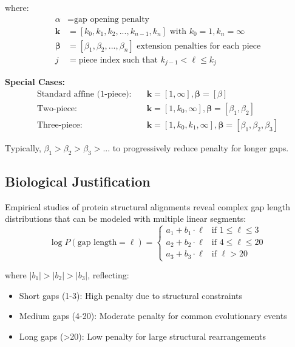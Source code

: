 \documentclass[11pt]{article}
\begin{document}
where:
\begin{align}
\alpha &= \text{gap opening penalty} \\
\mathbf{k} &= [k_0, k_1, k_2, ..., k_{n-1}, k_n] \text{ with } k_0 = 1, k_n = \infty \\
\boldsymbol{\beta} &= [\beta_1, \beta_2, ..., \beta_n] \text{ extension penalties for each piece} \\
j &= \text{piece index such that } k_{j-1} < \ell \leq k_j
\end{align}

\textbf{Special Cases:}
\begin{align}
\text{Standard affine (1-piece):} \quad &\mathbf{k} = [1, \infty], \boldsymbol{\beta} = [\beta] \\
\text{Two-piece:} \quad &\mathbf{k} = [1, k_0, \infty], \boldsymbol{\beta} = [\beta_1, \beta_2] \\
\text{Three-piece:} \quad &\mathbf{k} = [1, k_0, k_1, \infty], \boldsymbol{\beta} = [\beta_1, \beta_2, \beta_3]
\end{align}

Typically, $\beta_1 > \beta_2 > \beta_3 > ...$ to progressively reduce penalty for longer gaps.

\subsection{Biological Justification}

Empirical studies of protein structural alignments reveal complex gap length distributions that can be modeled with multiple linear segments:
\begin{equation}
\log P(\text{gap length} = \ell) = \begin{cases}
a_1 + b_1 \cdot \ell & \text{if } 1 \leq \ell \leq 3 \\
a_2 + b_2 \cdot \ell & \text{if } 4 \leq \ell \leq 20 \\
a_3 + b_3 \cdot \ell & \text{if } \ell > 20
\end{cases}
\end{equation}

where $|b_1| > |b_2| > |b_3|$, reflecting:
\begin{itemize}
\item Short gaps (1-3): High penalty due to structural constraints
\item Medium gaps (4-20): Moderate penalty for common evolutionary events
\item Long gaps (>20): Low penalty for large structural rearrangements
\end{itemize}
\end{document}

